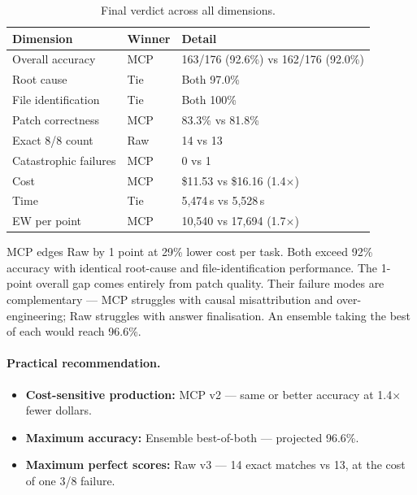 \begin{table}[h]
\centering
\caption{Final verdict across all dimensions.}\label{tab:verdict}
\begin{tabular}{lll}
\toprule
\textbf{Dimension} & \textbf{Winner} & \textbf{Detail} \\
\midrule
Overall accuracy       & MCP   & 163/176 (92.6\%) vs 162/176 (92.0\%) \\
Root cause             & Tie   & Both 97.0\% \\
File identification    & Tie   & Both 100\% \\
Patch correctness      & MCP   & 83.3\% vs 81.8\% \\
Exact 8/8 count        & Raw   & 14 vs 13 \\
Catastrophic failures  & MCP   & 0 vs 1 \\
Cost                   & MCP   & \$11.53 vs \$16.16 (1.4$\times$) \\
Time                   & Tie   & 5{,}474\,s vs 5{,}528\,s \\
EW per point           & MCP   & 10{,}540 vs 17{,}694 (1.7$\times$) \\
\bottomrule
\end{tabular}
\end{table}

\noindent
MCP edges Raw by 1 point at 29\% lower cost per task.
Both exceed 92\% accuracy with identical root-cause and
file-identification performance.
The 1-point overall gap comes entirely from patch quality.
Their failure modes are complementary --- MCP struggles with causal
misattribution and over-engineering; Raw struggles with answer
finalisation.
An ensemble taking the best of each would reach 96.6\%.

\paragraph{Practical recommendation.}
\begin{itemize}
  \item \textbf{Cost-sensitive production:} MCP v2 --- same or better
        accuracy at 1.4$\times$ fewer dollars.
  \item \textbf{Maximum accuracy:} Ensemble best-of-both --- projected
        96.6\%.
  \item \textbf{Maximum perfect scores:} Raw v3 --- 14 exact
        matches vs 13, at the cost of one 3/8 failure.
\end{itemize}
